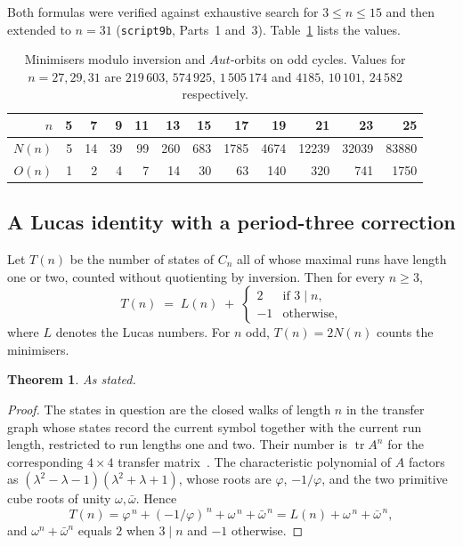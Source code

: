 \documentclass[11pt,a4paper]{article}
\def\mathrm#1{#1}%
\newtheorem{theorem}{Theorem}[section]
\newcommand{\Aut}{\mathrm{Aut}}
\begin{document}
Both formulas were verified against exhaustive search for $3\le n\le15$ and then extended to $n=31$ (\texttt{script9b}, Parts~1 and~3). Table~\ref{tab:counts} lists the values.

\begin{table}[h]
\centering
\small
\begin{tabular}{rrrrrrrrrrrr}
\toprule
$n$ & 5 & 7 & 9 & 11 & 13 & 15 & 17 & 19 & 21 & 23 & 25 \\
\midrule
$N(n)$ & 5 & 14 & 39 & 99 & 260 & 683 & 1785 & 4674 & 12239 & 32039 & 83880 \\
$O(n)$ & 1 & 2 & 4 & 7 & 14 & 30 & 63 & 140 & 320 & 741 & 1750 \\
\bottomrule
\end{tabular}
\caption{Minimisers modulo inversion and $\Aut$-orbits on odd cycles. Values for $n=27,29,31$ are $219\,603$, $574\,925$, $1\,505\,174$ and $4185$, $10\,101$, $24\,582$ respectively.}
\label{tab:counts}
\end{table}

\subsection{A Lucas identity with a period-three correction}

\begin{theorembox}
Let $T(n)$ be the number of states of $C_n$ all of whose maximal runs have length one or two, counted without quotienting by inversion. Then for every $n\ge3$,
\[
T(n)\;=\;L(n)\;+\;\begin{cases} 2 & \text{if } 3\mid n,\\ -1 & \text{otherwise,}\end{cases}
\]
where $L$ denotes the Lucas numbers. For $n$ odd, $T(n)=2N(n)$ counts the minimisers.
\end{theorembox}

\begin{theorem}
\label{thm:lucas}
As stated.
\end{theorem}

\begin{proof}
The states in question are the closed walks of length $n$ in the transfer graph whose states record the current symbol together with the current run length, restricted to run lengths one and two. Their number is $\operatorname{tr}A^n$ for the corresponding $4\times4$ transfer matrix~\citep[ch.~4]{Stanley2011}. The characteristic polynomial of $A$ factors as $(\lambda^2-\lambda-1)(\lambda^2+\lambda+1)$, whose roots are $\varphi$, $-1/\varphi$, and the two primitive cube roots of unity $\omega,\bar\omega$. Hence
\[
T(n)=\varphi^{\,n}+(-1/\varphi)^{\,n}+\omega^{\,n}+\bar\omega^{\,n}=L(n)+\omega^{\,n}+\bar\omega^{\,n},
\]
and $\omega^n+\bar\omega^n$ equals $2$ when $3\mid n$ and $-1$ otherwise.
\end{proof}
\end{document}

